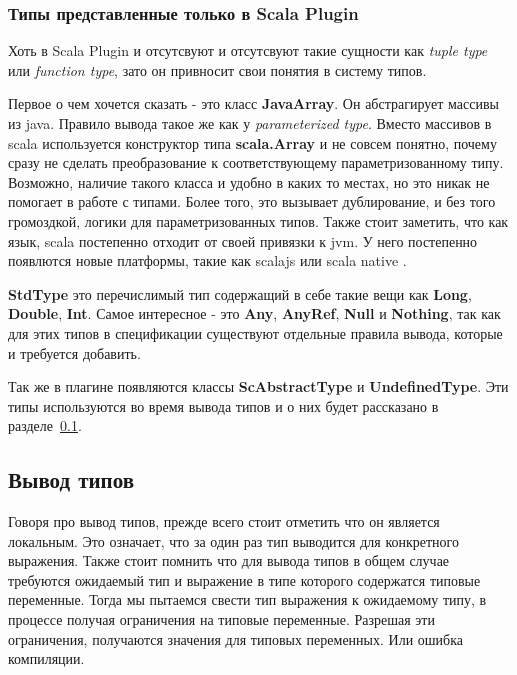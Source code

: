 \subsubsection{Типы представленные только в Scala Plugin}
Хоть в Scala Plugin и отсутсвуют и отсутсвуют такие сущности как
\textit{tuple type} или \textit{function type}, зато он привносит
свои понятия в систему типов.

Первое о чем хочется сказать - это класс \textbf{JavaArray}.
Он абстрагирует массивы из java.
Правило вывода такое же как у \textit{parameterized type}.
Вместо массивов в scala используется конструктор типа \textbf{scala.Array} и
не совсем понятно, почему сразу не сделать преобразование к соответствующему
параметризованному типу.
Возможно, наличие такого класса и удобно в каких то местах, но это никак не
помогает в работе с типами.
Более того, это вызывает дублирование, и без того громоздкой, логики для
параметризованных типов.
Также стоит заметить, что как язык, scala постепенно отходит от своей привязки к jvm.
У него постепенно появлются новые платформы, такие как scalajs \cite{scalajs}
или scala native \cite{scala_native}.

\textbf{StdType} это перечислимый тип содержащий в себе такие вещи как
\textbf{Long}, \textbf{Double}, \textbf{Int}.
Самое интересное - это \textbf{Any}, \textbf{AnyRef}, \textbf{Null} и
\textbf{Nothing}, так как для этих типов в спецификации существуют отдельные
правила вывода, которые и требуется добавить.

Так же в плагине появляются классы \textbf{ScAbstractType} и \textbf{UndefinedType}.
Эти типы используются во время вывода типов и о них будет рассказано в
разделе~\ref{sec:infer}.

\subsection{Вывод типов}
\label{sec:infer}

Говоря про вывод типов, прежде всего стоит отметить что он является локальным.
Это означает, что за один раз тип выводится для конкретного выражения.
Также стоит помнить что для вывода типов в общем случае требуются ожидаемый тип
и выражение в типе которого содержатся типовые переменные.
Тогда мы пытаемся свести тип выражения к ожидаемому типу, в процессе получая
ограничения на типовые переменные.
Разрешая эти ограничения, получаются значения для типовых переменных.
Или ошибка компиляции.

